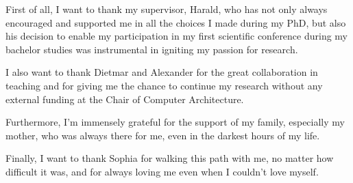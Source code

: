 First of all, I want to thank my supervisor, Harald, who has not only always encouraged and supported me in all the choices I made during my PhD, but also his decision to enable my participation in my first scientific conference during my bachelor studies was instrumental in igniting my passion for research.

I also want to thank Dietmar and Alexander for the great collaboration in teaching and for giving me the chance to continue my research without any external funding at the Chair of Computer Architecture.

Furthermore, I'm immensely grateful for the support of my family, especially my mother, who was always there for me, even in the darkest hours of my life.

Finally, I want to thank Sophia for walking this path with me, no matter how difficult it was, and for always loving me even when I couldn't love myself.